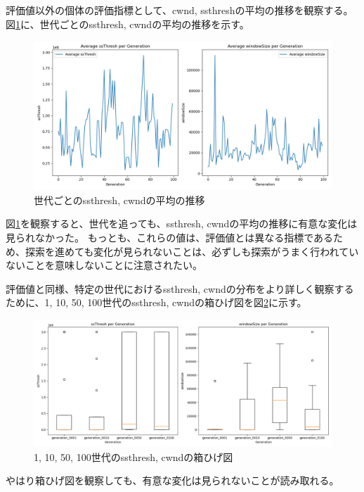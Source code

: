 \documentclass[a4paper,11pt]{jreport}
\newcommand{\figref}[1]{図\ref{#1}}
\begin{document}
評価値以外の個体の評価指標として、cwnd, ssthreshの平均の推移を観察する。
\figref{figure:generation_result}に、世代ごとのssthresh, cwndの平均の推移を示す。
\begin{figure}[thbp]
  \setlength\fboxsep{0pt}
  \centering
  \includegraphics[width=1.0\linewidth]{fig/chap05/generation_result.png}
  \caption{世代ごとのssthresh, cwndの平均の推移}
  \label{figure:generation_result}
\end{figure}
\figref{figure:generation_result}を観察すると、世代を追っても、ssthresh, cwndの平均の推移に有意な変化は見られなかった。
もっとも、これらの値は、評価値とは異なる指標であるため、探索を進めても変化が見られないことは、必ずしも探索がうまく行われていないことを意味しないことに注意されたい。

評価値と同様、特定の世代におけるssthresh, cwndの分布をより詳しく観察するために、1, 10, 50, 100世代のssthresh, cwndの箱ひげ図を\figref{figure:boxplot}に示す。
\begin{figure}[thbp]
  \setlength\fboxsep{0pt}
  \centering
  \includegraphics[width=1.0\linewidth]{fig/chap05/boxplot.png}
  \caption{1, 10, 50, 100世代のssthresh, cwndの箱ひげ図}
  \label{figure:boxplot}
\end{figure}
やはり箱ひげ図を観察しても、有意な変化は見られないことが読み取れる。

\newpage
\end{document}

